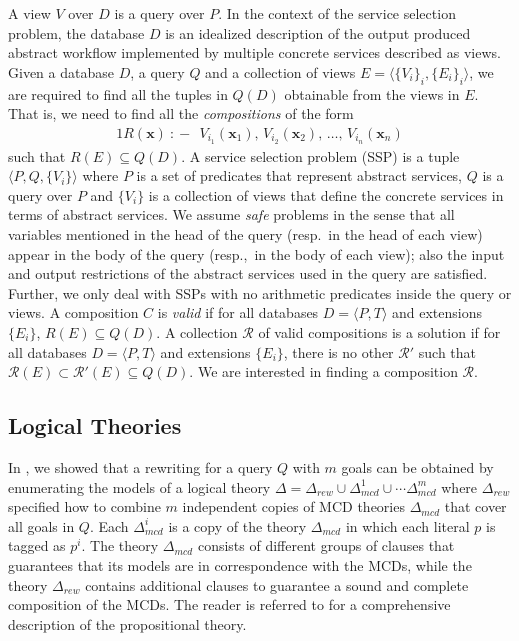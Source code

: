 \documentclass{llncs}
\newcommand{\tup}[1]{\langle #1 \rangle}
\newcommand{\vvec}[1]{\mathbf{#1}}
\newcommand{\R}{\mathcal{R}}
\newcommand{\qrule}{:\!\!-}
\begin{document}
A view $V$ over $D$ is a query over $P$. In the context of the service selection problem, 
the database $D$ is an idealized description of 
the output produced abstract workflow  implemented by multiple concrete services described
as views.
Given a database $D$, a query $Q$ and a collection of 
views $E=\tup{\{V_i\}_i,\{E_i\}_i}$, we are required to find
all the tuples in $Q(D)$ obtainable from the views in $E$.
That is, we need to find all the \emph{compositions} of the form
\begin{alignat*}{1}
R(\vvec{x})\ \qrule\ \ V_{i_1}(\vvec{x}_1),\, V_{i_2}(\vvec{x}_2),\, \ldots,\, V_{i_n}(\vvec{x}_n)
\end{alignat*}
such that $R(E) \subseteq Q(D)$.
A service selection problem (SSP) is a tuple $\tup{P,Q,\{V_i\}}$ where $P$
is a set of predicates that represent abstract services, $Q$ is a query over $P$ and $\{V_i\}$ is a collection of views that define the concrete services in terms of  abstract services. We assume \emph{safe} problems in the sense that all 
variables mentioned in the head of the query (resp.\ in the head of each view)
appear in the body of the query (resp.,\ in the body of each view); also the input and output restrictions of the abstract services used in the query are satisfied.
Further, we only deal with SSPs with no arithmetic predicates inside the
query or views.
A composition $C$ is \emph{valid} if for all databases $D=\tup{P,T}$
and extensions $\{E_i\}$, $R(E) \subseteq Q(D)$.
A collection $\R$ of valid compositions is a solution if
for all databases $D=\tup{P,T}$ and extensions $\{E_i\}$, there
is no other $\R'$ such that $\R(E)\subset\R'(E)\subseteq Q(D)$.
We are interested in finding a composition $\R$.

\subsection{Logical Theories}

In \cite{arvelo:aaai06}, we showed that a rewriting
for a query $Q$ with $m$ goals can be obtained by enumerating the
models of a logical theory
$\Delta=\Delta_{rew}\cup\Delta_{mcd}^1\cup\cdots\Delta_{mcd}^m$
where $\Delta_{rew}$ specified how to combine $m$ independent
copies of MCD theories $\Delta_{mcd}$ that cover all goals in $Q$.
Each $\Delta^i_{mcd}$ is a copy of the theory $\Delta_{mcd}$
in which each literal $p$ is tagged as $p^i$.
The theory $\Delta_{mcd}$ consists of different groups of 
clauses that guarantees that its models are in correspondence
with the MCDs, while the theory $\Delta_{rew}$ contains additional
clauses to guarantee a sound and complete composition of the MCDs.
The reader is referred to \cite{arvelo:aaai06} for a comprehensive
description of the propositional theory.
\end{document}
